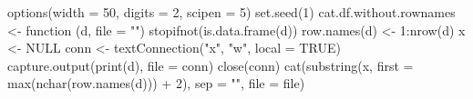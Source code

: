 \message{ !name(backtest.Rnw.tex)}{\makeatletter\gdef\AucTeX@cite#1[#2]#3{[#3#1#2]}\gdef\cite{\@ifnextchar[{\AucTeX@cite{, }}{\AucTeX@cite{}[]}}}

options(width = 50, digits = 2, scipen = 5)
set.seed(1)
cat.df.without.rownames <- function (d, file = ""){
  stopifnot(is.data.frame(d))
  row.names(d) <- 1:nrow(d)
  x <- NULL
  conn <- textConnection("x", "w", local = TRUE)
  capture.output(print(d), file = conn)
  close(conn)
  cat(substring(x, first = max(nchar(row.names(d))) + 2), sep = "\n", 
      file = file)
}


